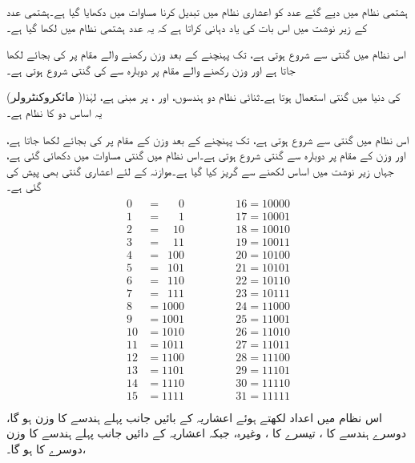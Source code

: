 	 ہشتمی نظام میں دیے گئے عدد کو اعشاری نظام میں تبدیل کرنا مساوات  میں دکھایا گیا ہے۔ہشتمی عدد کے زیر نوشت میں  اس بات کی یاد دہانی کراتا ہے کہ یہ عدد ہشتمی نظام میں لکھا گیا ہے۔ 
	 
	اس نظام میں گنتی  سے شروع ہوتی ہے،  تک پہنچنے کے بعد  وزن رکھنے والے مقام پر  کی بجائے  لکھا جاتا ہے اور  وزن رکھنے والے مقام پر دوبارہ سے  کی گنتی شروع ہوتی ہے۔

  (مائکروکنٹرولر )کی دنیا میں گنتی استعمال ہوتا ہے۔ثنائی نظام دو ہندسوں،  اور ، پر مبنی ہے، لہٰذا یہ اساس دو کا نظام ہے۔

اس نظام میں گنتی  سے شروع ہوتی ہے،  تک پہنچنے کے بعد  وزن  کے  مقام پر  کی بجائے  لکھا جاتا ہے، اور  وزن  کے  مقام پر دوبارہ  سے  گنتی شروع ہوتی ہے۔اس نظام میں گنتی  مساوات  میں دکھائی گئی ہے، جہاں زیر نوشت میں اساس لکھنے سے گریز کیا گیا ہے۔موازنہ کے لئے اعشاری گنتی بھی پیش کی گئی ہے۔
\begin{gather}
\begin{aligned}\label{مساوات_ثنائی_گنتی}
0&=\phantom{000}0 &\quad \quad \quad &16=10000\\
1&=\phantom{000}1 &\quad \quad \quad &17=10001\\
2&=\phantom{00}10 &\quad \quad \quad &18=10010\\
3&=\phantom{00}11 &\quad \quad \quad &19=10011\\
4&=\phantom{0}100 &\quad \quad \quad &20=10100\\
5&=\phantom{0}101 &\quad \quad \quad &21=10101\\
6&=\phantom{0}110 &\quad \quad \quad &22=10110\\
7&=\phantom{0}111 &\quad \quad \quad &23=10111\\
8&=1000 &\quad \quad \quad &24=11000\\
9&=1001 &\quad \quad \quad &25=11001\\
10&=1010 &\quad \quad \quad &26=11010\\
11&=1011 &\quad \quad \quad &27=11011\\
12&=1100 &\quad \quad \quad &28=11100\\
13&=1101 &\quad \quad \quad &29=11101\\
14&=1110 &\quad \quad \quad &30=11110\\
15&=1111 &\quad \quad \quad &31=11111\\
\end{aligned}
\end{gather}
	اس نظام میں اعداد لکھتے ہوئے اعشاریہ کے بائیں جانب پہلے ہندسے کا وزن  ہو گا، دوسرے ہندسے کا  ، تیسرے کا ، وغیرہ، جبکہ اعشاریہ کے دائیں جانب پہلے ہندسے کا وزن  ،دوسرے کا  ہو گا۔
	
